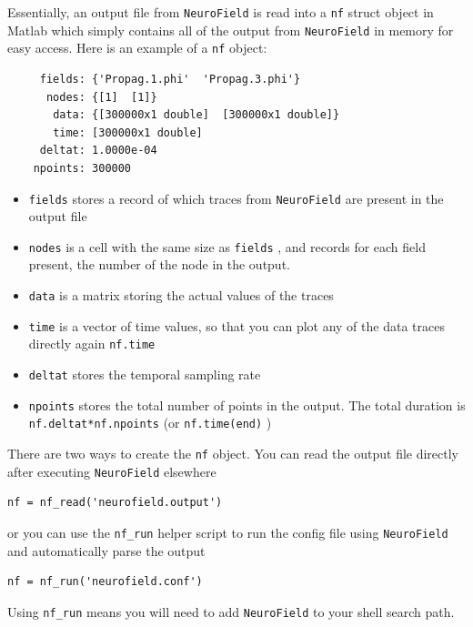 \documentclass[12pt,a4paper]{article}
\newcommand{\type}[1]{ {\small\small\tt #1} }
\newcommand{\NF}[0]{ \type{NeuroField}}
\begin{document}
Essentially, an output file from \NF is read into a \type{nf} struct object in Matlab which simply contains all of the output from \NF in memory for easy access. Here is an example of a \type{nf} object:
\begin{lstlisting}
     fields: {'Propag.1.phi'  'Propag.3.phi'}
      nodes: {[1]  [1]}
       data: {[300000x1 double]  [300000x1 double]}
       time: [300000x1 double]
     deltat: 1.0000e-04
    npoints: 300000
\end{lstlisting}
\begin{itemize}
\item \type{fields} stores a record of which traces from \NF are present in the output file
\item \type{nodes} is a cell with the same size as \type{fields}, and records for each field present, the number of the node in the output. 
\item \type{data} is a matrix storing the actual values of the traces
\item \type{time} is a vector of time values, so that you can plot any of the data traces directly again \type{nf.time}
\item \type{deltat} stores the temporal sampling rate
\item \type{npoints} stores the total number of points in the output. The total duration is \type{nf.deltat*nf.npoints} (or  \type{nf.time(end)})
\end{itemize}

There are two ways to create the \type{nf} object. You can read the output file directly after executing \NF elsewhere

\begin{lstlisting}
nf = nf_read('neurofield.output')
\end{lstlisting}

or you can use the \type{nf\_run} helper script to run the config file using \NF and automatically parse the output

\begin{lstlisting}
nf = nf_run('neurofield.conf')
\end{lstlisting}

Using \type{nf\_run} means you will need to add \NF to your shell search path.
\end{document}
